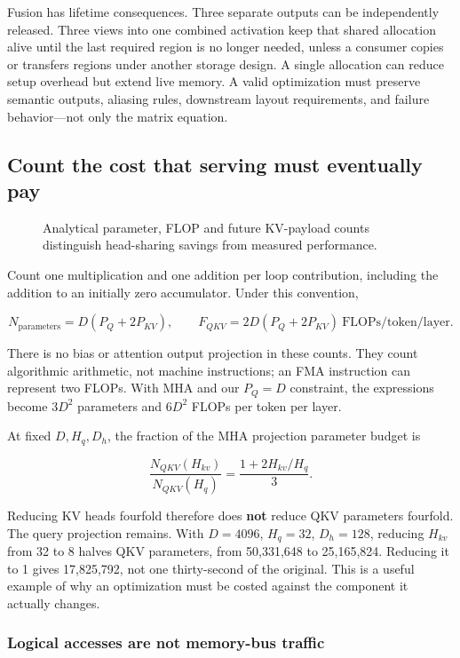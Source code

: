 \documentclass[
  10pt,
]{article}
\begin{document}
Fusion has lifetime consequences. Three separate outputs can be
independently released. Three views into one combined activation keep
that shared allocation alive until the last required region is no longer
needed, unless a consumer copies or transfers regions under another
storage design. A single allocation can reduce setup overhead but extend
live memory. A valid optimization must preserve semantic outputs,
aliasing rules, downstream layout requirements, and failure
behavior---not only the matrix equation.

\subsection{Count the cost that serving must eventually
pay}\label{count-the-cost-that-serving-must-eventually-pay}

\begin{figure}[H]\centering\resizebox{\linewidth}{!}{}\caption{Analytical parameter, FLOP and future KV-payload counts distinguish head-sharing savings from measured performance.}\end{figure}

Count one multiplication and one addition per loop contribution,
including the addition to an initially zero accumulator. Under this
convention,

\[
N_{\mathrm{parameters}}=D(P_Q+2P_{KV}),\qquad
F_{QKV}=2D(P_Q+2P_{KV})\ \text{FLOPs/token/layer}.
\]

There is no bias or attention output projection in these counts. They
count algorithmic arithmetic, not machine instructions; an FMA
instruction can represent two FLOPs. With MHA and our \(P_Q=D\)
constraint, the expressions become \(3D^2\) parameters and \(6D^2\)
FLOPs per token per layer.

At fixed \(D,H_q,D_h\), the fraction of the MHA projection parameter
budget is

\[
\frac{N_{QKV}(H_{kv})}{N_{QKV}(H_q)}
=\frac{1+2H_{kv}/H_q}{3}.
\]

Reducing KV heads fourfold therefore does \textbf{not} reduce QKV
parameters fourfold. The query projection remains. With \(D=4096\),
\(H_q=32\), \(D_h=128\), reducing \(H_{kv}\) from 32 to 8 halves QKV
parameters, from 50,331,648 to 25,165,824. Reducing it to 1 gives
17,825,792, not one thirty-second of the original. This is a useful
example of why an optimization must be costed against the component it
actually changes.

\subsubsection{Logical accesses are not memory-bus
traffic}\label{logical-accesses-are-not-memory-bus-traffic}
\end{document}

